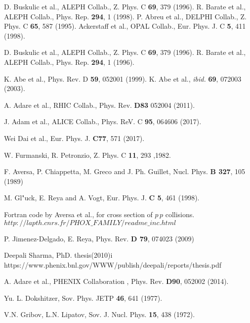 \documentclass{ws-ijmpa}
\begin{document}
\begin{thebibliography}{99}
D. Buskulic et al., ALEPH Collab., Z. Phys. C {\bf 69}, 379 (1996).
R. Barate et al., ALEPH Collab., Phys. Rep. {\bf 294}, 1 (1998).
P. Abreu et al., DELPHI Collab., Z. Phys. C {\bf 65}, 587 (1995).
Ackerstaff et al., OPAL Collab., Eur. Phys. J. C {\bf 5}, 411 (1998).

D. Buskulic et al., ALEPH Collab., Z. Phys. C {\bf 69}, 379 (1996).
R. Barate et al., ALEPH Collab., Phys. Rep. {\bf 294}, 1 (1996).

K. Abe et al., Phys. Rev. D {\bf 59}, 052001 (1999).
K. Abe et al., {\em ibid.} {\bf 69}, 072003 (2003).

A. Adare et al., RHIC Collab., Phys. Rev. {\bf D83} 052004 (2011).

J. Adam et al., ALICE Collab., Phys. ReV. C {\bf 95}, 064606 (2017).

Wei Dai et al., Eur. Phys. J. {\bf C77}, 571 (2017).

W. Furmanski, R. Petronzio, Z. Phys. C {\bf 11}, 293 ,1982.

F. Aversa, P. Chiappetta, M. Greco and J. Ph. Guillet,
Nucl. Phys. {\bf B 327}, 105 (1989)

M. Gl"uck, E. Reya and A. Vogt, Eur. Phys. J. {\bf C 5}, 461 (1998).

Fortran code by Aversa et al., for cross section of $p\,p$ collisions. \\
{\texttt{$http://lapth.cnrs.fr/PHOX\_FAMILY/readme\_inc.html$}}

P. Jimenez-Delgado, E. Reya,  Phys. Rev. {\bf D 79}, 074023 (2009)

Deepali Sharma, PhD. thesis(2010)i \\
https://www.phenix.bnl.gov/WWW/publish/deepali/reports/thesis.pdf

A. Adare et al., PHENIX Collaboration , Phys. Rev. {\bf D90}, 052002 (2014).

 Yu. L. Dokshitzer, Sov. Phys. JETP {\bf 46}, 641 (1977).

V.N. Gribov, L.N. Lipatov, Sov. J. Nucl. Phys. {\bf 15}, 438 (1972).


\end{thebibliography}
\end{document}
